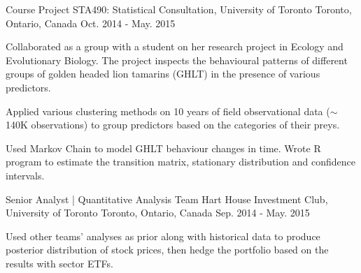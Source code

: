 \begin{cventries}
  \cventry
    {Course Project} %
    {STA490: Statistical Consultation, University of Toronto} %
    {Toronto, Ontario, Canada} %
    {Oct. 2014 - May. 2015} %
    {
      \begin{cvitems} %
        \item {Collaborated as a group with a student on her research project in Ecology and Evolutionary Biology. The project inspects the behavioural patterns of different groups of golden headed lion tamarins (GHLT) in the presence of various predictors.}\\ 
        \begin{cvitems} 
          \item {Applied various clustering methods on 10 years of field observational data ($\sim$140K observations) to group predictors based on the categories of their preys.}
          \item {Used Markov Chain to model GHLT behaviour changes in time. Wrote R program to estimate the transition matrix, stationary distribution and confidence intervals.}\\
        \end{cvitems}
      \end{cvitems}
    }

\end{cventries}

\begin{cventries}

  \cventry
    {Senior Analyst | Quantitative Analysis Team} %
    {Hart House Investment Club, University of Toronto} %
    {Toronto, Ontario, Canada} %
    {Sep. 2014 - May. 2015} %
    {
      \begin{cvitems} %
        \item {Used other teams’ analyses as prior along with historical data to produce posterior distribution of stock prices, then hedge the portfolio based on the results with sector ETFs.}
      \end{cvitems}
    }
\end{cventries}
